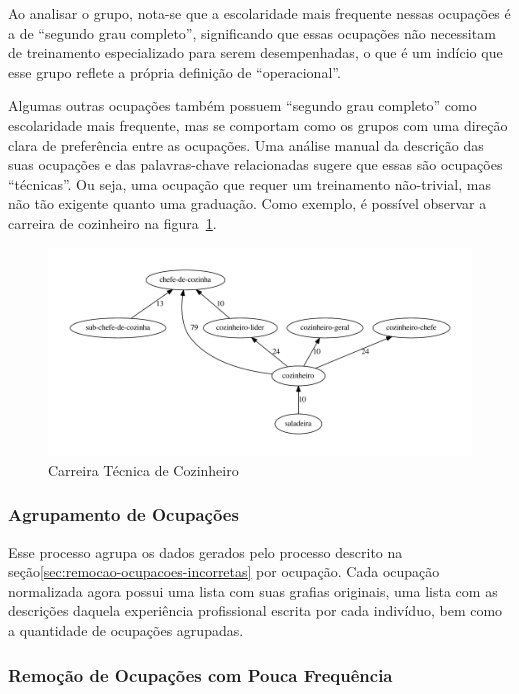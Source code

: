 \documentclass[12pt,a4paper]{article}
\theoremstyle{hypo}
\begin{document}
Ao analisar o grupo, nota-se que a escolaridade mais frequente nessas ocupações é a de \enquote{segundo grau completo}, significando que essas ocupações não necessitam de treinamento especializado para serem desempenhadas, o que é um indício que esse grupo reflete a própria definição de \enquote{operacional}.

Algumas outras ocupações também possuem \enquote{segundo grau completo} como escolaridade mais frequente, mas se comportam como os grupos com uma direção clara de preferência entre as ocupações. Uma análise manual da descrição das suas ocupações e das palavras-chave relacionadas sugere que essas são ocupações \enquote{técnicas}. Ou seja, uma ocupação que requer um treinamento não-trivial, mas não tão exigente quanto uma graduação. Como exemplo, é possível observar a carreira de cozinheiro na figura~\ref{fig:exemplo-grafo-cozinheiro}.

\begin{figure}[htb]
  \centering
  \includegraphics[scale=0.6]{subcluster_01_11.pdf}
  \caption{Carreira Técnica de Cozinheiro}
  \label{fig:exemplo-grafo-cozinheiro}
\end{figure}

\subsubsection{Agrupamento de Ocupações}

Esse processo agrupa os dados gerados pelo processo descrito na seção\ref{sec:remocao-ocupacoes-incorretas} por ocupação. Cada ocupação normalizada agora possui uma lista com suas grafias originais, uma lista com as descrições daquela experiência profissional escrita por cada indivíduo, bem como a quantidade de ocupações agrupadas.

\subsubsection{Remoção de Ocupações com Pouca Frequência}
\end{document}
